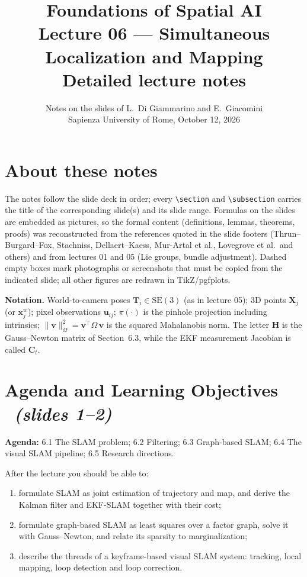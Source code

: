\documentclass[11pt,a4paper]{article}
\title{\textbf{Foundations of Spatial AI}\\[2pt] Lecture 06 --- Simultaneous Localization and Mapping\\[4pt]\large Detailed lecture notes}
\author{Notes on the slides of L.~Di Giammarino and E.~Giacomini\\ Sapienza University of Rome, October 12, 2026}
\date{}
\newcommand{\slr}[1]{\texorpdfstring{\ \emph{(slides #1)}}{ (slides #1)}}
\newcommand{\bX}{\mathbf{X}}
\newcommand{\bH}{\mathbf{H}}
\newcommand{\bC}{\mathbf{C}}
\newcommand{\bT}{\mathbf{T}}
\newcommand{\SE}{\mathrm{SE}(3)}
\newcommand{\norm}[2]{\lVert #1\rVert_{#2}}
\begin{document}
\maketitle
\tableofcontents

\section*{About these notes}
The notes follow the slide deck in order; every \verb|\section| and \verb|\subsection| carries the title of the corresponding slide(s) and its slide range. Formulas on the slides are embedded as pictures, so the formal content (definitions, lemmas, theorems, proofs) was reconstructed from the references quoted in the slide footers (Thrun--Burgard--Fox, Stachniss, Dellaert--Kaess, Mur-Artal et al., Lovegrove et al.\ and others) and from lectures 01 and 05 (Lie groups, bundle adjustment). Dashed empty boxes mark photographs or screenshots that must be copied from the indicated slide; all other figures are redrawn in TikZ/pgfplots.

\textbf{Notation.} World-to-camera poses $\bT_i\in\SE$ (as in lecture 05); 3D points $\bX_j$ (or $\mathbf x_j^w$); pixel observations $\mathbf u_{ij}$; $\pi(\cdot)$ is the pinhole projection including intrinsics; $\norm{\mathbf v}{\Omega}^2=\mathbf v^\top\Omega\,\mathbf v$ is the squared Mahalanobis norm. The letter $\bH$ is the Gauss--Newton matrix of Section~6.3, while the EKF measurement Jacobian is called $\bC_t$.

\section*{Agenda and Learning Objectives \slr{1--2}}
\textbf{Agenda:} 6.1 The SLAM problem; 6.2 Filtering; 6.3 Graph-based SLAM; 6.4 The visual SLAM pipeline; 6.5 Research directions.

After the lecture you should be able to:
\begin{enumerate}[nosep]
\item formulate SLAM as joint estimation of trajectory and map, and derive the Kalman filter and EKF-SLAM together with their cost;
\item formulate graph-based SLAM as least squares over a factor graph, solve it with Gauss--Newton, and relate its sparsity to marginalization;
\item describe the threads of a keyframe-based visual SLAM system: tracking, local mapping, loop detection and loop correction.
\end{enumerate}
\end{document}

